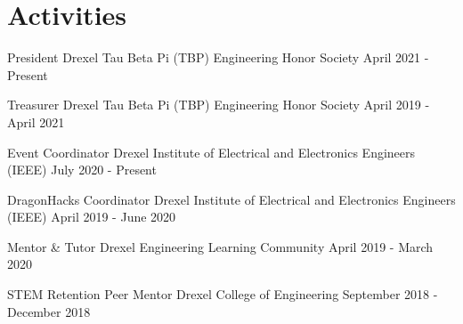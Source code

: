 \section{Activities}

\activity
  {President}
  {Drexel Tau Beta Pi (TBP) Engineering Honor Society}
  {April 2021 - Present}

\activity
  {Treasurer}
  {Drexel Tau Beta Pi (TBP) Engineering Honor Society}
  {April 2019 - April 2021}

\activity
  {Event Coordinator}
  {Drexel Institute of Electrical and Electronics Engineers (IEEE)}
  {July 2020 - Present}

\activity
  {DragonHacks Coordinator}
  {Drexel Institute of Electrical and Electronics Engineers (IEEE)}
  {April 2019 - June 2020}

\activity
  {Mentor \& Tutor}
  {Drexel Engineering Learning Community}
  {April 2019 - March 2020}

\activity
  {STEM Retention Peer Mentor}
  {Drexel College of Engineering}
  {September 2018 - December 2018}